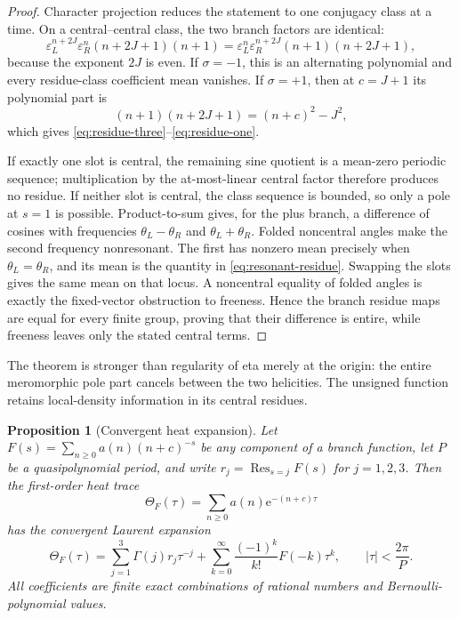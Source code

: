 \documentclass[11pt]{article}
\newtheorem{proposition}[theorem]{Proposition}
\theoremstyle{definition}
\DeclareMathOperator{\Res}{Res}
\newcommand{\e}{\mathrm e}
\begin{document}
\begin{proof}
Character projection reduces the statement to one conjugacy class at
a time.  On a central--central class, the two branch factors are
identical:
\[
 \varepsilon_L^{n+2J}\varepsilon_R^n(n+2J+1)(n+1)
 =
 \varepsilon_L^n\varepsilon_R^{n+2J}(n+1)(n+2J+1),
\]
because the exponent $2J$ is even.  If $\sigma=-1$, this is an
alternating polynomial and every residue-class coefficient mean
vanishes.  If $\sigma=+1$, then at $c=J+1$ its polynomial part is
\[
 (n+1)(n+2J+1)=(n+c)^2-J^2,
\]
which gives \eqref{eq:residue-three}--\eqref{eq:residue-one}.

If exactly one slot is central, the remaining sine quotient is a
mean-zero periodic sequence; multiplication by the at-most-linear
central factor therefore produces no residue.  If neither slot is
central, the class sequence is bounded, so only a pole at $s=1$ is
possible.  Product-to-sum gives, for the plus branch, a difference of
cosines with frequencies $\theta_L-\theta_R$ and
$\theta_L+\theta_R$.  Folded noncentral angles make the second
frequency nonresonant.  The first has nonzero mean precisely when
$\theta_L=\theta_R$, and its mean is the quantity in
\eqref{eq:resonant-residue}.  Swapping the slots gives the same mean
on that locus.  A noncentral equality of folded angles is exactly the
fixed-vector obstruction to freeness.  Hence the branch residue maps
are equal for every finite group, proving that their difference is
entire, while freeness leaves only the stated central terms.
\end{proof}

The theorem is stronger than regularity of eta merely at the origin:
the entire meromorphic pole part cancels between the two helicities.
The unsigned function retains local-density information in its
central residues.

\begin{proposition}[Convergent heat expansion]
\label{prop:heat-expansion}
Let $F(s)=\sum_{n\geq0}a(n)(n+c)^{-s}$ be any component of a branch
function, let $P$ be a quasipolynomial period, and write
$r_j=\Res_{s=j}F(s)$ for $j=1,2,3$.  Then the first-order heat trace
\[
 \Theta_F(\tau)=\sum_{n\geq0}a(n)\e^{-(n+c)\tau}
\]
has the convergent Laurent expansion
\begin{equation}
 \Theta_F(\tau)
 =\sum_{j=1}^{3}\Gamma(j)r_j\tau^{-j}
  +\sum_{k=0}^{\infty}\frac{(-1)^k}{k!}F(-k)\tau^k,
 \qquad |\tau|<\frac{2\pi}{P}.
 \label{eq:heat-expansion}
\end{equation}
All coefficients are finite exact combinations of rational numbers
and Bernoulli-polynomial values.
\end{proposition}
\end{document}
